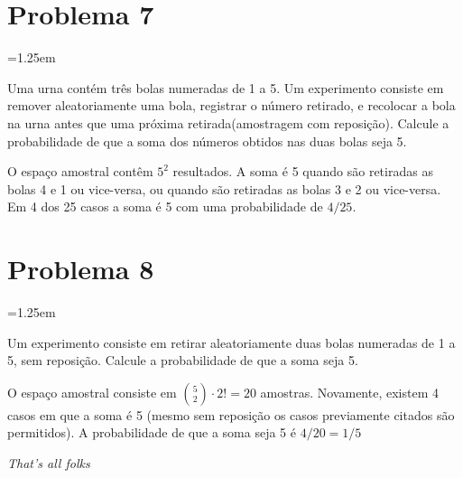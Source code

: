\documentclass{article}
\renewcommand\it[1]{\textit{#1}}
\newenvironment{nscenter}
 {\parskip=1.25em\par\nopagebreak\centering}
 {\par\noindent\ignorespacesafterend}
\begin{document}
\section*{Problema 7}
\begin{nscenter}
Uma urna contém três bolas numeradas de 1 a 5. Um experimento consiste em remover aleatoriamente
uma bola, registrar o número retirado, e recolocar a bola na urna antes que uma próxima
retirada(amostragem com reposição). Calcule a probabilidade de que a soma dos números obtidos nas
duas bolas seja 5.
\end{nscenter}
O espaço amostral contêm $5^2$ resultados. A soma é 5 quando são retiradas as bolas 4 e 1 ou
vice-versa, ou quando são retiradas as bolas 3 e 2 ou vice-versa. Em 4 dos 25 casos a soma é 5 com
uma probabilidade de $4/25$.

\section*{Problema 8}
\begin{nscenter}
Um experimento consiste em retirar aleatoriamente duas bolas numeradas de 1 a 5, sem reposição.
Calcule a probabilidade de que a soma seja 5.
\end{nscenter}
O espaço amostral consiste em ${5 \choose 2} \cdot 2! = 20$ amostras. Novamente, existem 4 casos
em que a soma é 5 (mesmo sem reposição os casos previamente citados são permitidos).  A
probabilidade de que a soma seja 5 é $4/20 = 1/5$

\it{That's all folks}
\end{document}
